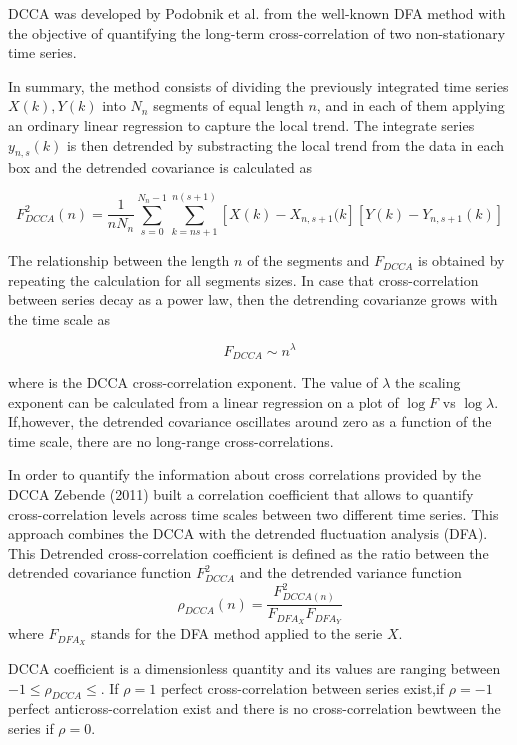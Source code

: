 \documentclass[onecolumn, preprint,aps,amsmath, amssymb, superscriptaddress]{revtex4}
\begin{document}
DCCA was developed by Podobnik et al. \cite{Podobnik} from the well-known DFA method \cite{Peng} with the objective of quantifying the long-term cross-correlation of two non-stationary time series. 

In summary, the method consists of dividing the previously integrated time series $X(k),Y(k)$ into $N_n$ segments of equal length $n$, and in each of them applying an ordinary linear regression to capture the local trend. 
The integrate series $y_{n,s}(k)$ is then detrended by substracting the local trend from the data in each box and the detrended covariance is calculated as

\begin{equation}
F^2_{DCCA}(n) = \dfrac{1}{nN_n}\sum_{s=0}^{N_n-1}\sum_{k=ns+1}^{n(s+1)}\left[X(k)-X_{n,s+1}(k\right] \left[Y(k)-Y_{n,s+1}(k)\right]
\end{equation}

The relationship between the length $n$ of the segments and $F_{DCCA}$ is obtained by repeating the calculation for all segments sizes. In case that cross-correlation between series decay as a power law, then the detrending covarianze grows with the time scale as

\begin{equation}
F_{DCCA}\sim n^\lambda
\end{equation}

where  is the DCCA cross-correlation exponent. The value of $\lambda$ the scaling exponent can be calculated from a linear regression on a plot of $\log F$ vs $\log \lambda$. If,however, the detrended covariance oscillates around zero as a function of the time scale, there are no long-range cross-correlations.

In order to quantify the information about cross correlations provided by the DCCA Zebende (2011) built a correlation coefficient that allows to quantify cross-correlation levels across time scales between two different time series. This approach combines the DCCA with the detrended fluctuation analysis (DFA). This Detrended cross-correlation coefficient is defined as the ratio between the detrended covariance function $F^2_{DCCA}$ and the detrended variance function \cite{Zebende}
\begin{equation}
    \rho_{DCCA}(n) =\dfrac{F^2_{DCCA(n)}}{F_{DFA_X}F_{DFA_Y}}
\end{equation}
where $F_{DFA_X}$ stands for the DFA method applied to the serie $X$.

DCCA coefficient is a dimensionless quantity and its
values are ranging between $-1 \leq \rho_{DCCA} \leq$. If $\rho = 1$ perfect cross-correlation between series exist,if $\rho = -1$ perfect anticross-correlation exist and there is no cross-correlation bewtween the series if $\rho = 0$. 
\end{document}
